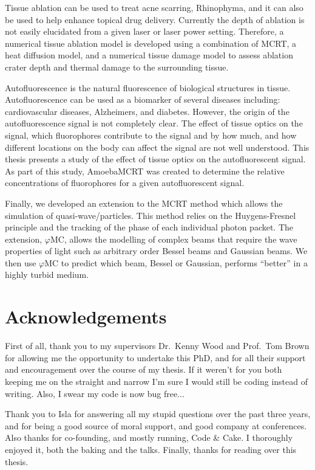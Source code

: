 \documentclass[10pt,a4paper,twoside]{book}
\begin{document}
Tissue ablation can be used to treat acne scarring, Rhinophyma, and it can also be used to help enhance topical drug delivery.
Currently the depth of ablation is not easily elucidated from a given laser or laser power setting.
Therefore, a numerical tissue ablation model is developed using a combination of MCRT, a heat diffusion model, and a numerical tissue damage model to assess ablation crater depth and thermal damage to the surrounding tissue.

Autofluorescence is the natural fluorescence of biological structures in tissue.
Autofluorescence can be used as a biomarker of several diseases including: cardiovascular diseases, Alzheimers, and diabetes.
However, the origin of the autofluorescence signal is not completely clear.
The effect of tissue optics on the signal, which fluorophores contribute to the signal and by how much, and how different locations on the body can affect the signal are not well understood.
This thesis presents a study of the effect of tissue optics on the autofluorescent signal.
As part of this study, AmoebaMCRT was created to determine the relative concentrations of fluorophores for a given autofluorescent signal.

Finally, we developed an extension to the MCRT method which allows the simulation of quasi-wave/particles.
This method relies on the Huygens-Fresnel principle and the tracking of the phase of each individual photon packet.
The extension, $\varphi$MC, allows the modelling of complex beams that require the wave properties of light such as arbitrary order Bessel beams and Gaussian beams.
We then use $\varphi$MC to predict which beam, Bessel or Gaussian, performs ``better'' in a highly turbid medium.


\chapter{Acknowledgements}
First of all, thank you to my supervisors Dr.~Kenny Wood and Prof.~Tom Brown for allowing me the opportunity to undertake this PhD, and for all their support and encouragement over the course of my thesis.
If it weren't for you both keeping me on the straight and narrow I'm sure I would still be coding instead of writing.
Also, I swear my code is now bug free...
\medskip


Thank you to Isla for answering all my stupid questions over the past three years, and for being a good source of moral support, and good company at conferences.
Also thanks for co-founding, and mostly running, Code \& Cake. I thoroughly enjoyed it, both the baking and the talks.
Finally, thanks for reading over this thesis.
\medskip
\end{document}
